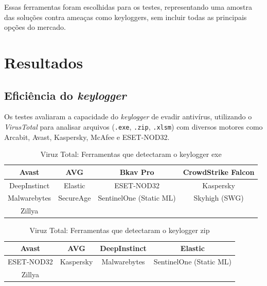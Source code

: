 \documentclass[12pt]{article}
\begin{document}
Essas ferramentas foram escolhidas para os testes, representando uma amostra das soluções contra ameaças como keyloggers, sem incluir todas as principais opções do mercado.

\section{Resultados}

\subsection{Eficiência do \textit{keylogger}}

Os testes avaliaram a capacidade do \textit{keylogger} de evadir antivírus, utilizando o \textit{VirusTotal} para analisar arquivos (\texttt{.exe}, \texttt{.zip}, \texttt{.xlsm}) com diversos motores como Arcabit, Avast, Kaspersky, McAfee e ESET-NOD32.

\FloatBarrier %

\begin{table}[H]
    \centering
    \begin{tabular}{|c|c|c|c|}
        \hline
        Avast & AVG & Bkav Pro & CrowdStrike Falcon \\
        \hline
        DeepInstinct & Elastic & ESET-NOD32 & Kaspersky \\
        \hline
        Malwarebytes & SecureAge & SentinelOne (Static ML) & Skyhigh (SWG) \\
        \hline
        Zillya & & & \\
        \hline
    \end{tabular}
    \caption{Viruz Total: Ferramentas que detectaram o keylogger exe}
\end{table}


\begin{table}[H]
    \centering
    \begin{tabular}{|c|c|c|c|}
        \hline
        Avast                & AVG                    & DeepInstinct           & Elastic                \\ 
        \hline
        ESET-NOD32           & Kaspersky              & Malwarebytes           & SentinelOne (Static ML)\\ 
        \hline
        Zillya               &                        &                         &                        \\ 
        \hline
    \end{tabular}
    \caption{Viruz Total: Ferramentas que detectaram o keylogger zip}
\end{table}
\end{document}
